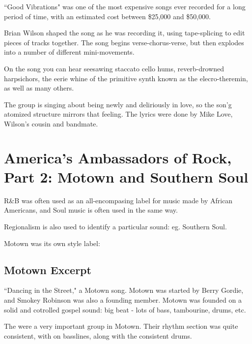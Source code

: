 \documentclass[12pt, a4paper, twoside, openright, titlepage]{book}
\begin{document}
``Good Vibrations" was one of the most expensive songs ever recorded for a long period of time, with an estimated cost between \$25,000 and \$50,000.

\begin{note}{}{}
    Brian Wilson shaped the song as he was recording it, using tape-splicing to edit pieces of tracks together. The song begins verse-chorus-verse, but then explodes into a number of different mini-movements.
\end{note}

\begin{rmk}{}{}
    On the song you can hear seesawing staccato cello hums, reverb-drowned harpsichors, the eerie whine of the primitive synth known as the elecro-theremin, as well as many others.
\end{rmk}

The group is singing about being newly and deliriously in love, so the son'g atomized structure mirrors that feeling. The lyrics were done by Mike Love, Wilson's cousin and bandmate.








\chapter{America's Ambassadors of Rock, Part 2: Motown and Southern Soul}


\begin{rec}{}{}
    R\&B was often used as an all-encompasing label for music made by African Americans, and Soul music is often used in the same way.
\end{rec}

Regionalism is also used to identify a particular sound: eg. Southern Soul.


Motown was its own style label:

\section{Motown Excerpt}

``Dancing in the Street," a Motown song. Motown was started by Berry Gordie, and Smokey Robinson was also a founding member. Motown was founded on a solid and cotrolled gospel sound: big beat - lots of bass, tambourine, drums, etc.

The  were a very important group in Motown. Their rhythm section was quite consistent, with  on basslines, along with the consistent drums.
\end{document}
